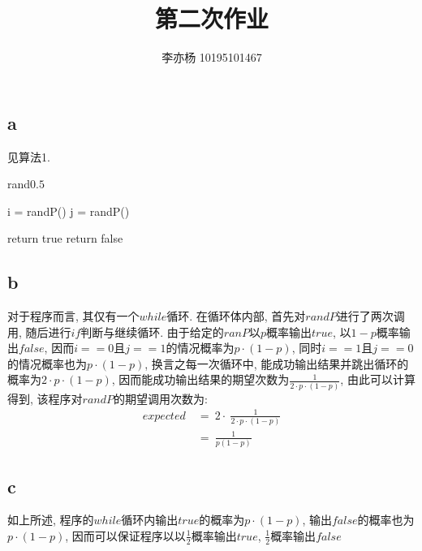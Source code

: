 \documentclass{article}
\begin{document}
 
 
 
\title{第二次作业}
\author{李亦杨 10195101467}
 
\maketitle

\section{}
\subsection{a}
见算法1.
\begin{algorithm}
\caption{rand$0.5$}
\begin{algorithmic}[1]
\State i = randP()
\State j = randP()

\State return true
\State return false
\EndIf
\EndWhile
\EndProcedure
\end{algorithmic}
\end{algorithm}

\subsection{b}

对于程序而言, 其仅有一个$while$循环. 在循环体内部, 首先对$randP$进行了两次调用, 随后进行$if$判断与继续循环. 由于给定的$ranP$以$p$概率输出$true$, 以$1-p$概率输出$false$, 因而$i == 0$且$j == 1$的情况概率为$p \cdot (1-p)$, 同时$i == 1$且$j == 0$的情况概率也为$p \cdot (1-p)$, 换言之每一次循环中, 能成功输出结果并跳出循环的概率为$2 \cdot p \cdot (1-p)$, 因而能成功输出结果的期望次数为$\frac{1}{2 \cdot p \cdot (1-p)}$, 由此可以计算得到, 该程序对$randP$的期望调用次数为:
\begin{align*}
expected\ &=\ 2 \cdot \ \frac{1}{2 \cdot p \cdot (1-p)} \\
&=\ \frac{1}{p(1-p)}
\end{align*}

\subsection{c}
如上所述, 程序的$while$循环内输出$true$的概率为$p \cdot (1-p)$, 输出$false$的概率也为$p \cdot (1-p)$, 因而可以保证程序以以$\frac{1}{2}$概率输出$true$, $\frac{1}{2}$概率输出$false$
\end{document}

